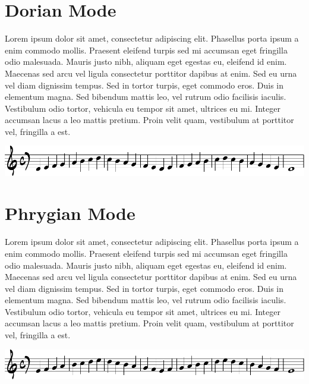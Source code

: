 \documentclass[11pt]{article}
\begin{document}
\section*{Dorian Mode}
\label{sec:org5e53fd9}

Lorem ipsum dolor sit amet, consectetur adipiscing elit. Phasellus
porta ipsum a enim commodo mollis. Praesent eleifend turpis sed mi
accumsan eget fringilla odio malesuada. Mauris justo nibh, aliquam
eget egestas eu, eleifend id enim. Maecenas sed arcu vel ligula
consectetur porttitor dapibus at enim. Sed eu urna vel diam dignissim
tempus. Sed in tortor turpis, eget commodo eros. Duis in elementum
magna. Sed bibendum mattis leo, vel rutrum odio facilisis iaculis.
Vestibulum odio tortor, vehicula eu tempor sit amet, ultrices eu mi.
Integer accumsan lacus a leo mattis pretium. Proin velit quam,
vestibulum at porttitor vel, fringilla a est.

\begin{center}
\includegraphics[width=.9\linewidth]{dorian.pdf}
\end{center}

\section*{Phrygian Mode}
\label{sec:org47bb6fe}

Lorem ipsum dolor sit amet, consectetur adipiscing elit. Phasellus
porta ipsum a enim commodo mollis. Praesent eleifend turpis sed mi
accumsan eget fringilla odio malesuada. Mauris justo nibh, aliquam
eget egestas eu, eleifend id enim. Maecenas sed arcu vel ligula
consectetur porttitor dapibus at enim. Sed eu urna vel diam dignissim
tempus. Sed in tortor turpis, eget commodo eros. Duis in elementum
magna. Sed bibendum mattis leo, vel rutrum odio facilisis iaculis.
Vestibulum odio tortor, vehicula eu tempor sit amet, ultrices eu mi.
Integer accumsan lacus a leo mattis pretium. Proin velit quam,
vestibulum at porttitor vel, fringilla a est.

\begin{center}
\includegraphics[width=.9\linewidth]{phrygian.pdf}
\end{center}
\end{document}
